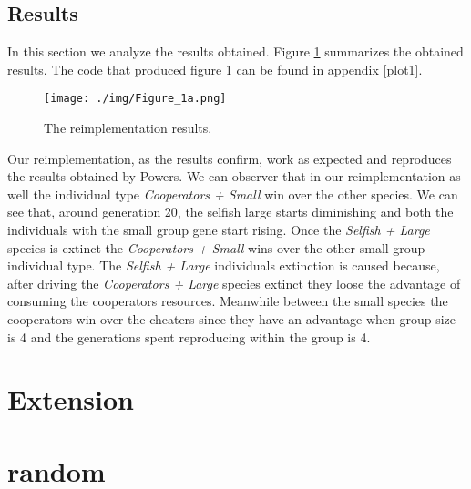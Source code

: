\documentclass[runningheads]{llncs}
\begin{document}
\subsection{Results}
In this section we analyze the results obtained. Figure \ref{fig1}
summarizes the obtained results. The code that produced figure
\ref{fig1} can be found in appendix \ref{plot1}.
\begin{figure}
\texttt{[image: ./img/Figure\_1a.png]}
\caption{The reimplementation results.} \label{fig1}
\end{figure}
Our reimplementation, as the results confirm, work as expected and
reproduces the results obtained by Powers. We can observer that in our
reimplementation as well the individual type \textit{Cooperators +
  Small} win over the other species. We can see that, around
generation 20, the selfish large starts diminishing and both the
individuals with the small group gene start rising. Once the
\textit{Selfish + Large} species is extinct the \textit{Cooperators +
  Small} wins over the other small group individual type. The
\textit{Selfish + Large} individuals extinction is caused because,
after driving the \textit{Cooperators + Large} species extinct they
loose the advantage of consuming the cooperators resources. Meanwhile
between the small species the cooperators win over the cheaters since
they have an advantage when group size is 4 and the generations spent
reproducing within the group is 4.


\section{Extension}






\section{random}
\end{document}
